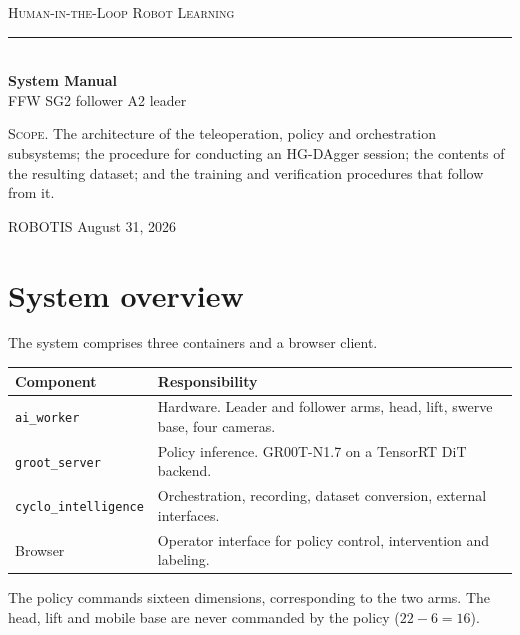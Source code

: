 \documentclass[11pt,a4paper]{article}
\begin{document}
\begin{titlepage}
\centering
\vspace*{3.2cm}
{\Large\scshape Human-in-the-Loop Robot Learning}\\[3mm]
\rule{9cm}{0.5pt}\\[4mm]
{\LARGE\bfseries System Manual}\\[10mm]
{\large FFW SG2 follower \quad A2 leader}\\[24mm]

\begin{minipage}{12cm}
\small
\textsc{Scope.} The architecture of the teleoperation, policy and orchestration
subsystems; the procedure for conducting an HG-DAgger session; the contents of
the resulting dataset; and the training and verification procedures that follow
from it.

\end{minipage}

\vfill
{\small ROBOTIS \quad August 31, 2026}
\end{titlepage}

\tableofcontents
\thispagestyle{empty}
\newpage
\setcounter{page}{1}

\section{System overview}

The system comprises three containers and a browser client.

\begin{center}
\small
\begin{tabular}{@{}lp{10.2cm}@{}}
\toprule
\textbf{Component} & \textbf{Responsibility}\\
\midrule
\texttt{ai\_worker}          & Hardware. Leader and follower arms, head, lift, swerve base, four cameras.\\
\texttt{groot\_server}       & Policy inference. GR00T-N1.7 on a TensorRT DiT backend.\\
\texttt{cyclo\_intelligence} & Orchestration, recording, dataset conversion, external interfaces.\\
Browser                      & Operator interface for policy control, intervention and labeling.\\
\bottomrule
\end{tabular}
\end{center}

The policy commands sixteen dimensions, corresponding to the two arms. The head,
lift and mobile base are never commanded by the policy ($22-6=16$).
\end{document}
